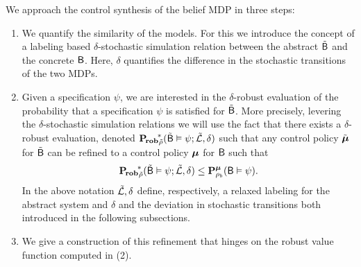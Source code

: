 \documentclass{ifacconf}
\begin{document}
We approach  the control synthesis of the belief MDP in three steps:
\begin{enumerate}
\item We quantify the similarity of the models. For this we introduce the concept of a labeling based $\delta$-stochastic  simulation relation between  the abstract $\tilde{\mathsf{B}}$ and the concrete $\mathsf{B}$. Here, $\delta$ quantifies the difference in the stochastic transitions of the two MDPs.
\item Given a specification $\psi$, we are interested in  the $\delta$-robust evaluation of the probability that a specification $\psi$ is satisfied for  $\tilde{\mathsf{B}}$.  More precisely, levering the $\delta$-stochastic simulation relations we will use the fact that there exists  a $\delta$-robust evaluation, denoted
$\mathbf{P_{\! rob}}_{\tilde \init}^{\!\ast}(\tilde \MB\vDash\psi; \tilde\Labset,\delta) %
$ 
such that any control policy ${\tilde {{\boldsymbol{\mu}}}}$ for $\tilde {\mathsf{B}}$ can be refined to a control policy   ${ {\boldsymbol{\mu}}}$ for $  \mathsf{B}$ such that 
 \begin{align}
\mathbf{P_{\! rob}}_{\tilde {\rho}}^{\!\ast}(\tilde {\mathsf{B}}\vDash\psi; \tilde{\mathcal{L}},\delta) 
 \leq  \mathbf P _{\rho_b}^{{\boldsymbol{\mu}}}(\mathsf{B}\vDash\psi).
\end{align}
In the above notation $\tilde{\mathcal{L}},\delta$ define, respectively, a relaxed labeling for the abstract system and $\delta$ and the deviation in stochastic transitions both introduced in the following subsections.
\item We give a construction of this refinement that hinges on the robust value function computed in (2).
\end{enumerate}




\end{document}
